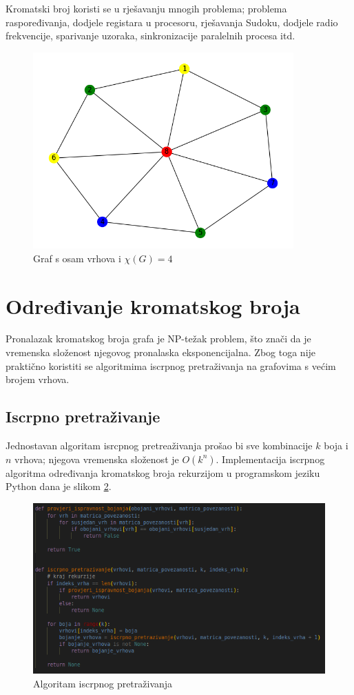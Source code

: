\documentclass[times, utf8, zavrsni]{fer}
\begin{document}
Kromatski broj koristi se u rješavanju mnogih problema; problema raspoređivanja, dodjele registara u procesoru, rješavanja Sudoku, dodjele radio frekvencije, sparivanje uzoraka, sinkronizacije paralelnih procesa itd. 

\begin{figure}[htb]
\centering
\includegraphics[width=10cm]{images/8_vertices_example.png}
\caption{Graf s osam vrhova i $\chi(G)=4$}
\label{fig:graf s obojanim vrhovima}
\end{figure}

\section{Određivanje kromatskog broja}
Pronalazak kromatskog broja grafa je NP-težak problem, što znači da je vremenska složenost njegovog pronalaska eksponencijalna. Zbog toga nije praktično koristiti se algoritmima iscrpnog pretraživanja na grafovima s većim brojem vrhova.

\subsection{Iscrpno pretraživanje}
Jednostavan algoritam isrcpnog pretreaživanja prošao bi sve kombinacije $k$ boja i $n$ vrhova; njegova vremenska složenost je $O(k^n)$. Implementacija iscrpnog algoritma određivanja kromatskog broja rekurzijom u programskom jeziku Python dana je slikom \ref{fig:algoritam iscrpnog pretraživanja}.

\begin{figure}[htb]
\centering
\includegraphics[width=12cm]{images/iscrpno_pretrazivanje.png}
\caption{Algoritam iscrpnog pretraživanja}
\label{fig:algoritam iscrpnog pretraživanja}
\end{figure}
\end{document}
